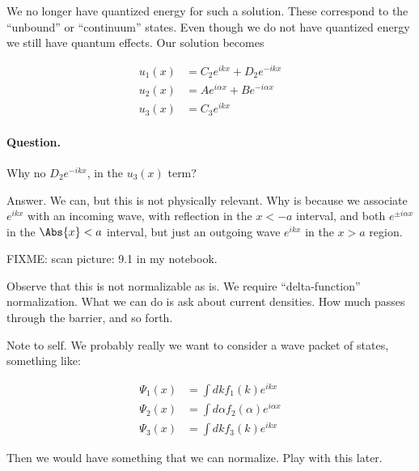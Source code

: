 We no longer have quantized energy for such a solution.  These correspond to the ``unbound'' or ``continuum'' states.  Even though we do not have quantized energy we still have quantum effects.  Our solution becomes

\begin{equation}\label{eqn:lecture9boundStates:320}
\begin{aligned}
u_1(x) &=
C_2 e^{i k x}
+D_2 e^{-i k x}  \\
u_2(x) &=
A e^{i \alpha x}
+B e^{-i \alpha x}  \\
u_3(x) &=
C_3 e^{i k x}
\end{aligned}
\end{equation}

\paragraph{Question.}  Why no $D_2 e^{-i k x}$, in the $u_3(x)$ term?

Answer.  We can, but this is not physically relevant.  Why is because we associate $e^{ikx}$ with an incoming wave, with reflection in the $x < -a$ interval, and both $e^{\pm i \alpha x}$ in the $\Abs{x} < a$ interval, but just an outgoing wave $e^{i k x}$ in the $x > a$ region.

FIXME: scan picture: 9.1 in my notebook.

Observe that this is not normalizable as is.  We require ``delta-function'' normalization.  What we can do is ask about current densities.  How much passes through the barrier, and so forth.

Note to self.  We probably really we want to consider a wave packet of states, something like:

\begin{equation}\label{eqn:lecture9boundStates:340}
\begin{aligned}
\Psi_1(x) &= \int dk f_1(k) e^{i k x} \\
\Psi_2(x) &= \int d\alpha f_2(\alpha) e^{i \alpha x} \\
\Psi_3(x) &= \int dk f_3(k) e^{i k x}
\end{aligned}
\end{equation}

Then we would have something that we can normalize.  Play with this later.

